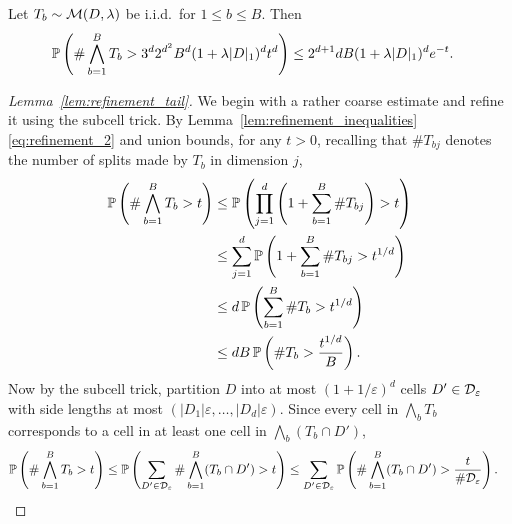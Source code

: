 \begin{lemma}
  \label{lem:refinement_tail}

  Let $T_b \sim \cM(D, \lambda)$ be i.i.d.\ for $1 \leq b \leq B$. Then
  \begin{align*}
    \P\left(
      \# \bigwedge_{b=1}^B T_b
      > 3^d 2^{d^2} B^d (1+\lambda|D|_1)^d t^d
    \right)
    &\leq
    2^{d+1} d B (1 + \lambda |D|_1)^d e^{-t}.
  \end{align*}

\end{lemma}

\begin{proof}[Lemma~\ref{lem:refinement_tail}]

  We begin with a rather coarse estimate and refine it using the subcell trick.
  By Lemma~\ref{lem:refinement_inequalities} \eqref{eq:refinement_2} and
  union bounds, for any $t > 0$, recalling that $\# T_{b j}$ denotes the number
  of splits made by $T_b$ in dimension $j$,
  \begin{align}
    \nonumber
    \P\left(
      \# \bigwedge_{b=1}^B T_b
      > t
    \right)
    &\leq
    \P\left(
      \prod_{j=1}^d
      \left(
        1 + \sum_{b=1}^B \# T_{b j}
      \right)
      > t
    \right) \\
    \nonumber
    &\leq
    \sum_{j=1}^d
    \P\left(
      1 + \sum_{b=1}^B \# T_{b j}
      > t^{1/d}
    \right) \\
    \nonumber
    &\leq
    d\, \P\left(
      \sum_{b=1}^B \# T_b
      > t^{1/d}
    \right) \\
    \label{eq:refinement_tail_coarse}
    &\leq
    d B\,
    \P\left(
      \# T_b > \frac{t^{1/d}}{B}
    \right).
  \end{align}
  Now by the subcell trick, partition $D$ into
  at most $(1 + 1/\varepsilon)^d$ cells
  $D' \in \cD_\varepsilon$ with side lengths at most
  $(|D_1| \varepsilon, \ldots, |D_d| \varepsilon)$.
  Since every cell in $\bigwedge_b T_b$ corresponds to
  a cell in at least one cell in $\bigwedge_b (T_b \cap D')$,
  \begin{align*}
    \P\left(
      \# \bigwedge_{b=1}^B T_b
      > t
    \right)
    &\leq
    \P\left(
      \sum_{D' \in \cD_\varepsilon}
      \# \bigwedge_{b=1}^B (T_b \cap D')
      > t
    \right)
    \leq
    \sum_{D' \in \cD_\varepsilon}
    \P\left(
      \# \bigwedge_{b=1}^B (T_b \cap D')
      > \frac{t}{\# \cD_\varepsilon}
    \right).
  \end{align*}

\end{proof}
